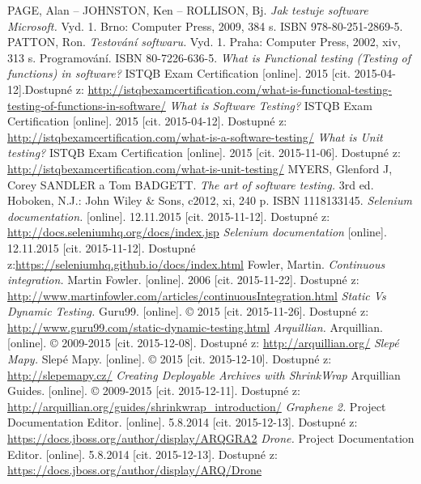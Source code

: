 \documentclass[
    color,   %
	table,   %
    twoside, %
    nolot, nolof
]{fithesis3}
\begin{document}
\renewcommand{\refname}{Seznam literatury}
\begin{thebibliography}{9}
PAGE, Alan – JOHNSTON, Ken – ROLLISON, Bj. \emph{Jak testuje software Microsoft.} Vyd. 1. Brno: Computer Press, 2009, 384 s. ISBN 978-80-251-2869-5.
PATTON, Ron. \emph{Testování softwaru.} Vyd. 1. Praha: Computer Press, 2002, xiv, 313 s. Programování. ISBN 80-7226-636-5. 
\emph{What is Functional testing (Testing of functions) in software?} ISTQB Exam Certification [online]. 2015 [cit. 2015-04-12].Dostupné z: \url{http://istqbexamcertification.com/what-is-functional-testing-testing-of-functions-in-software/}
\emph{What is Software Testing?} ISTQB Exam Certification [online]. 2015 [cit. 2015-04-12]. Dostupné z: \url{http://istqbexamcertification.com/what-is-a-software-testing/}
\emph{What is Unit testing?} ISTQB Exam Certification [online]. 2015 [cit. 2015-11-06]. Dostupné z: \url{http://istqbexamcertification.com/what-is-unit-testing/}
MYERS, Glenford J, Corey SANDLER a Tom BADGETT. \emph{The art of software testing.} 3rd ed. Hoboken, N.J.: John Wiley \& Sons, c2012, xi, 240 p. ISBN 1118133145.
\emph{Selenium documentation.} [online]. 12.11.2015 [cit. 2015-11-12]. Dostupné z: \url{http://docs.seleniumhq.org/docs/index.jsp}
\emph{Selenium documentation} [online]. 12.11.2015 [cit. 2015-11-12]. Dostupné z:\url{https://seleniumhq.github.io/docs/index.html}
Fowler, Martin. \emph{Continuous integration.} Martin Fowler. [online]. 2006 [cit. 2015-11-22]. Dostupné z: \url{http://www.martinfowler.com/articles/continuousIntegration.html}
\emph{Static Vs Dynamic Testing.} Guru99. [online]. © 2015 [cit. 2015-11-26]. Dostupné z: \url{http://www.guru99.com/static-dynamic-testing.html}
\emph{Arquillian.} Arquillian. [online]. © 2009-2015 [cit. 2015-12-08]. Dostupné z: \url{http://arquillian.org/}
\emph{Slepé Mapy.} Slepé Mapy. [online]. © 2015 [cit. 2015-12-10]. Dostupné z: \url{http://slepemapy.cz/}
\emph{Creating Deployable Archives with ShrinkWrap} Arquillian Guides. [online]. © 2009-2015 [cit. 2015-12-11]. Dostupné z: \url{http://arquillian.org/guides/shrinkwrap_introduction/}
\emph{Graphene 2.} Project Documentation Editor. [online]. 5.8.2014 [cit. 2015-12-13]. Dostupné z: \url{https://docs.jboss.org/author/display/ARQGRA2}
\emph{Drone.} Project Documentation Editor. [online]. 5.8.2014 [cit. 2015-12-13]. Dostupné z: \url{https://docs.jboss.org/author/display/ARQ/Drone}

\end{thebibliography}
\end{document}
